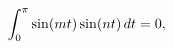 \[\int_{0}^{\pi}\mathop{\sin\/}\nolimits\!\left(mt\right)\mathop{\sin\/}%
\nolimits\!\left(nt\right)dt=0,\]